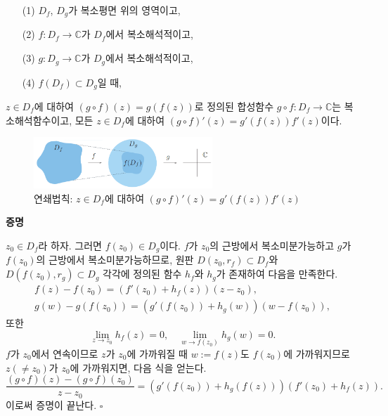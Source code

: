 \begin{saltprop}[연쇄법칙]{}{} \label{prop-2-2} 
\begin{itemize}
\item[(1)] $D_f$, $D_g$가 복소평면 위의 영역이고,
\item[(2)] $f:D_f \to \mathbb C$가 $D_f$에서 복소해석적이고,
\item[(3)] $g:D_g \to \mathbb C$가 $D_g$에서 복소해석적이고,
\item[(4)] $f(D_f) \subset D_g$일 때,
\end{itemize}
$z\in D_f$에 대하여 $(g\circ f)(z) = g(f(z))$로 정의된
합성함수 $g\circ f : D_f \to \mathbb C$는 %
복소해석함수이고, 
모든 $z\in D_f$에 대하여 $(g\circ f)'(z) = g'(f(z))f'(z)$이다.
\end{saltprop}

\begin{figure}[!h]
\begin{center}
\includegraphics[width=0.6\textwidth]{./SaltChapter/figs/fig-2-3}
\end{center}
\caption{연쇄법칙: $z\in D_f$에 대하여 $(g\circ f)'(z) = g'(f(z))f'(z)$}
\label{fig-2-3}
\end{figure}

{\bf 증명}

$z_0\in D_f$라 하자. 그러면 $f(z_0)\in D_g$이다.
$f$가 $z_0$의 근방에서 복소미분가능하고
$g$가 $f(z_0)$의 근방에서 복소미분가능하므로,
원판 $D(z_0, r_f)\subset D_f$와 $D(f(z_0), r_g) \subset D_g$ 각각에 정의된
함수 $h_f$와 $h_g$가 존재하여 다음을 만족한다.
\begin{gather*}
f(z) - f(z_0) = (f'(z_0)+h_f(z))(z-z_0), \\
g(w) - g(f(z_0)) = (g'(f(z_0)) + h_g(w))(w-f(z_0)),
\end{gather*}
또한
\[
\lim_{z\to z_0} h_f(z)=0, \quad
\lim_{w\to f(z_0)} h_g(w)=0.
\]
$f$가 $z_0$에서 연속이므로
$z$가 $z_0$에 가까워질 때 $w:=f(z)$도 $f(z_0)$에 가까워지므로
$z(\ne z_0)$가 $z_0$에 가까워지면, 다음 식을 얻는다.
\[
\dfrac{(g\circ f)(z) - (g\circ f)(z_0)}{z-z_0} 
= (g'(f(z_0)) + h_g(f(z)))(f'(z_0) + h_f(z)).
\]
이로써 증명이 끝난다. \hfill $\square$

